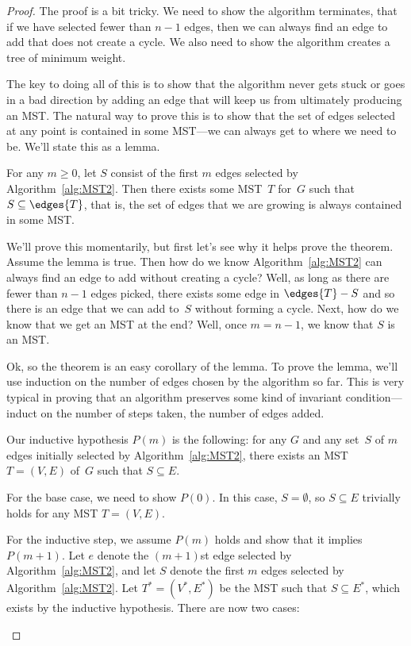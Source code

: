 \begin{proof}
The proof is a bit tricky.  We need to show the algorithm terminates,
\ie that if we have selected fewer than $n - 1$ edges, then we can
always find an edge to add that does not create a cycle.  We also need
to show the algorithm creates a tree of minimum weight.

The key to doing all of this is to show that the algorithm never gets
stuck or goes in a bad direction by adding an edge that will keep us
from ultimately producing an MST\@.  The natural way to prove this is
to show that the set of edges selected at any point is contained in
some MST---\ie we can always get to where we need to be.  We'll state
this as a lemma.

\begin{lemma}\label{lemma:MST2}
  For any $m \ge 0$, let $S$ consist of the first $m$ edges selected by
  Algorithm~\ref{alg:MST2}.  Then there exists some MST~$T$ for~$G$ such
  that $S \subseteq \edges{T}$, that is, the set of edges that we are
  growing is always contained in some MST\@.
\end{lemma}

We'll prove this momentarily, but first let's see why it helps prove the
theorem.  Assume the lemma is true.  Then how do we know
Algorithm~\ref{alg:MST2} can always find an edge to add without creating a
cycle?  Well, as long as there are fewer than $n - 1$ edges picked, there
exists some edge in $\edges{T} - S$ and so there is an edge that we can
add to~$S$ without forming a cycle.  Next, how do we know that we get an
MST at the end?  Well, once $m = n - 1$, we know that $S$ is an MST\@.

Ok, so the theorem is an easy corollary of the lemma.  To prove the
lemma, we'll use induction on the number of edges chosen by the
algorithm so far.  This is very typical in proving that an algorithm
preserves some kind of invariant condition---induct on the number of
steps taken, \ie the number of edges added.

Our inductive hypothesis $P(m)$ is the following: for any $G$ and any
set~$S$ of $m$ edges initially selected by Algorithm~\ref{alg:MST2},
there exists an MST $T = (V, E)$ of~$G$ such that $S \subseteq E$.

For the base case, we need to show $P(0)$.  In this case, $S =
\emptyset$, so $S \subseteq E$ trivially holds for any MST $T = (V,
E)$.

For the inductive step, we assume $P(m)$ holds and show that it
implies $P(m + 1)$.  Let $e$ denote the $(m+1)$st edge selected by
Algorithm~\ref{alg:MST2}, and let $S$ denote the first $m$ edges
selected by Algorithm~\ref{alg:MST2}.  Let $T^* = (V^*, E^*)$ be the
MST such that $S \subseteq E^*$, which exists by the inductive
hypothesis.  There are now two cases:
\begin{description}


\end{description}
\end{proof}
